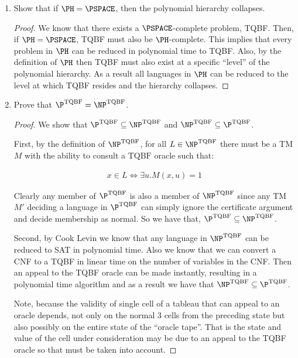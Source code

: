 \documentclass[usletter]{article}
\begin{document}
\begin{enumerate}
    \item Show that if $\PH = \PSPACE$, then the polynomial hierarchy collapses.

      \begin{proof}
        We know that there exists a $\PSPACE$-complete problem, TQBF. Then, if $\PH = \PSPACE$, TQBF must also be $\PH$-complete. This implies that every problem in $\PH$ can be reduced in polynomial time to TQBF. Also, by the definition of $\PH$ then TQBF must also exist at a specific ``level'' of the polynomial hierarchy. As a result all languages in $\PH$ can be reduced to the level at which TQBF resides and the hierarchy collapses.
      \end{proof}

    \item Prove that $\P^{\text{TQBF}} = \NP^{\text{TQBF}}$.

      \begin{proof}
        We show that $\P^{\text{TQBF}} \subseteq \NP^{\text{TQBF}}$ and $\NP^{\text{TQBF}} \subseteq \P^{\text{TQBF}}$.

        First, by the definition of $\NP^{\text{TQBF}}$, for all $L \in \NP^{\text{TQBF}}$ there must be a TM $M$ with the ability to consult a $\text{TQBF}$ oracle such that:

      \begin{align}
        x \in L \iff \exists u.M(x,u) = 1
      \end{align}

      Clearly any member of $\P^{\text{TQBF}}$ is also a member of $\NP^{\text{TQBF}}$ since any TM $M'$ deciding a language in $\P^{\text{TQBF}}$ can simply ignore the certificate argument and decide membership as normal. So we have that, $\P^{\text{TQBF}} \subseteq \NP^{\text{TQBF}}$.

      Second, by Cook Levin we know that any language in $\NP^{\text{TQBF}}$ can be reduced to SAT in polynomial time. Also we know that we can convert a CNF to a TQBF in linear time on the number of variables in the CNF. Then an appeal to the TQBF oracle can be made instantly, resulting in a polynomial time algorithm and as a result we have that $\NP^{\text{TQBF}} \subseteq \P^{\text{TQBF}}$.

      Note, because the validity of single cell of a tableau that can appeal to an oracle depends, not only on the normal 3 cells from the preceding state but also possibly on the entire state of the ``oracle tape''. That is the state and value of the cell under consideration may be due to an appeal to the TQBF oracle so that must be taken into account.


\end{proof}
\end{enumerate}
\end{document}
